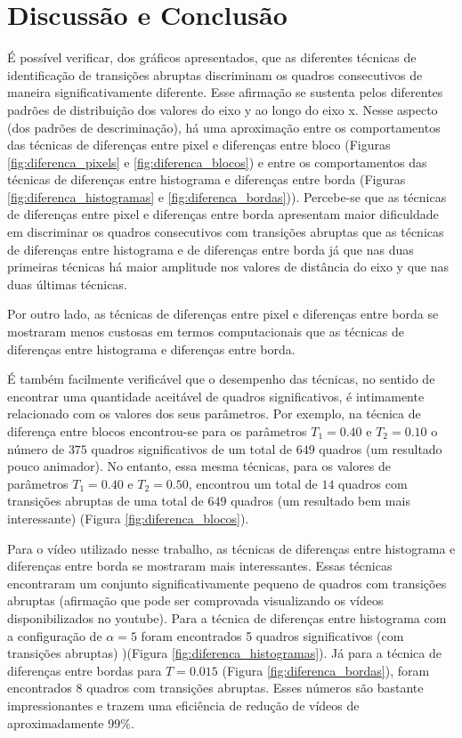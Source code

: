 \documentclass{article}
\begin{document}
\section{Discussão e Conclusão}
É possível verificar, dos gráficos apresentados, que as diferentes técnicas de identificação de transições abruptas discriminam os quadros consecutivos de maneira significativamente diferente. Esse afirmação se sustenta pelos diferentes padrões de distribuição dos valores do eixo y ao longo do eixo x. Nesse aspecto (dos padrões de descriminação), há uma aproximação entre os comportamentos das técnicas de diferenças entre pixel e diferenças entre bloco (Figuras \ref{fig:diferenca_pixels} e \ref{fig:diferenca_blocos}) e entre os comportamentos das técnicas de diferenças entre histograma e diferenças entre borda (Figuras \ref{fig:diferenca_histogramas} e \ref{fig:diferenca_bordas})). Percebe-se que as técnicas de diferenças entre pixel e diferenças entre borda apresentam maior dificuldade em discriminar os quadros consecutivos com transições abruptas que as técnicas de diferenças entre histograma e de diferenças entre borda já que nas duas primeiras técnicas há maior amplitude nos valores de distância do eixo y que nas duas últimas técnicas.

Por outro lado, as técnicas de diferenças entre pixel e diferenças entre borda se mostraram menos custosas em termos computacionais que as técnicas de diferenças entre histograma e diferenças entre borda.

É também facilmente verificável que o desempenho das técnicas, no sentido de encontrar uma quantidade aceitável de quadros significativos, é  intimamente relacionado com os valores dos seus parâmetros. Por exemplo, na técnica de diferença entre blocos encontrou-se para os parâmetros $T_1=0.40$ e $T_2=0.10$ o número de $375$ quadros significativos de um total de $649$ quadros (um resultado pouco animador). No entanto, essa mesma técnicas, para os valores de parâmetros $T_1=0.40$ e $T_2=0.50$, encontrou um total de $14$ quadros com transições abruptas de uma total de $649$ quadros (um resultado bem mais interessante) (Figura \ref{fig:diferenca_blocos}).

Para o vídeo utilizado nesse trabalho, as técnicas de diferenças entre histograma e diferenças entre borda se mostraram mais interessantes. Essas técnicas encontraram um conjunto significativamente pequeno de quadros com transições abruptas (afirmação que pode ser comprovada visualizando os vídeos disponibilizados no youtube). Para a técnica de diferenças entre histograma com a configuração de $\alpha=5$ foram encontrados 5 quadros significativos (com transições abruptas) )(Figura \ref{fig:diferenca_histogramas}). Já para a técnica de diferenças entre bordas para $T=0.015$ (Figura \ref{fig:diferenca_bordas}), foram encontrados 8 quadros com transições abruptas. Esses números são bastante impressionantes e trazem uma eficiência de redução de vídeos de aproximadamente $99\%$.
\end{document}
